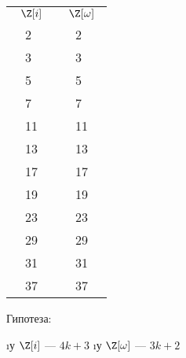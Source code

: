\begin{solution}
\begin{table}[H]
\centering
\begin{tabular}{llllll}
\multicolumn{3}{c}{$\Z[i]$} & \multicolumn{3}{c}{$\Z[\omega]$} \\
        & 2      & \x     & \y       & 2        &          \\
\y      & 3      &        &          & 3        & \x       \\
        & 5      & \x     & \y       & 5        &          \\
\y      & 7      &        &          & 7        & \x       \\
\y      & 11     &        & \y       & 11       &          \\
        & 13     & \x     &          & 13       & \x       \\
        & 17     & \x     & \y       & 17       &          \\
\y      & 19     &        &          & 19       & \x       \\
\y      & 23     &        & \y       & 23       &          \\
        & 29     & \x     & \y       & 29       &          \\
\y      & 31     &        &          & 31       & \x       \\
        & 37     & \x     &          & 37       & \x        
\end{tabular}
\end{table}

Гипотеза:
\begin{itemize}
\i у \(\Z[i]\) --- \(4k+3\)
\i у \(\Z[\omega]\) --- \(3k+2\)
\end{itemize}
\end{solution}

\begin{problem}[14 (3.9)]
\end{problem}

